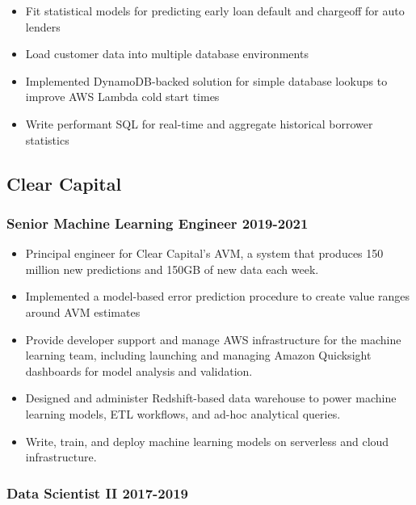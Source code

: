 \documentclass[11pt,a4paper,]{awesome-cv}
\providecommand{\tightlist}{%
	\setlength{\itemsep}{0pt}\setlength{\parskip}{0pt}}
\begin{document}
\begin{itemize}
\tightlist
\item
  Fit statistical models for predicting early loan default and chargeoff
  for auto lenders
\item
  Load customer data into multiple database environments
\item
  Implemented DynamoDB-backed solution for simple database lookups to
  improve AWS Lambda cold start times
\item
  Write performant SQL for real-time and aggregate historical borrower
  statistics
\end{itemize}

\hypertarget{clear-capital}{%
\subsection{Clear Capital}\label{clear-capital}}

\hypertarget{senior-machine-learning-engineer--2021}{%
\subsubsection{\texorpdfstring{Senior Machine Learning Engineer
\hfill 2019-2021}{Senior Machine Learning Engineer -2021}}\label{senior-machine-learning-engineer--2021}}

\begin{itemize}
\tightlist
\item
  Principal engineer for Clear Capital's AVM, a system that produces 150
  million new predictions and 150GB of new data each week.
\item
  Implemented a model-based error prediction procedure to create value
  ranges around AVM estimates
\item
  Provide developer support and manage AWS infrastructure for the
  machine learning team, including launching and managing Amazon
  Quicksight dashboards for model analysis and validation.
\item
  Designed and administer Redshift-based data warehouse to power machine
  learning models, ETL workflows, and ad-hoc analytical queries.
\item
  Write, train, and deploy machine learning models on serverless and
  cloud infrastructure.
\end{itemize}

\hypertarget{data-scientist-ii--2019}{%
\subsubsection{\texorpdfstring{Data Scientist II
\hfill 2017-2019}{Data Scientist II -2019}}\label{data-scientist-ii--2019}}
\end{document}
